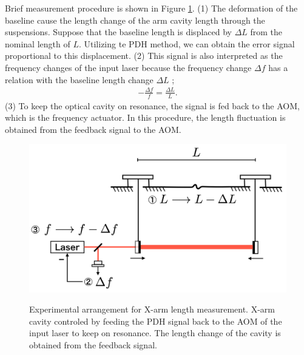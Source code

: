 Brief measurement procedure is shown in Figure \ref{img:img600}. (1) The deformation of the baseline cause the length change of the arm cavity length through the suspensions. Suppose that the baseline length is displaced by $\Delta{L}$ from the nominal length
of $L$. Utilizing te PDH method, we can obtain the error signal proportional to this displacement. (2) This signal is also interpreted as the frequency changes of the input laser because the frequency change $\Delta{f}$ has a relation with the baseline length change $\Delta{L}$ \cite{izumi2012multi};
\begin{eqnarray}
  \displaystyle -\frac{\Delta{f}}{f} = \frac{\Delta{L}}{L}.
\end{eqnarray}
(3) To keep the optical cavity on resonance, the signal is fed back to the AOM, which is the frequency actuator. In this procedure, the length fluctuation is obtained from the feedback signal to the AOM.
\begin{figure}[h]
  \centering
  \includegraphics[width=13cm]{./img_chap6/img600.png}\label{img:img600}
  \caption{Experimental arrangement for X-arm length measurement. X-arm cavity controled by feeding the PDH signal back to the AOM of the input laser to keep on resonance. The length change of the cavity is obtained from the feedback signal.}
\end{figure}


